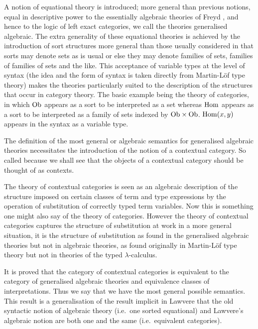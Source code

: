 

A notion of equational theory is introduced; more general than previous notions, equal in descriptive power to the essentially algebraic theories of Freyd \cite{freyd:aspects-of-topoi}, and hence to the logic of left exact categories, we call the theories generalised algebraic.
%
The extra generality of these equational theories is achieved by the introduction of sort structures more general than those usually considered in that sorts may denote sets as is usual or else they may denote families of sets, families of families of sets and the like.
%
This acceptance of variable types at the level of syntax (the idea and the form of syntax is taken directly from Martin-Löf type theory) makes the theories particularly suited to the description of the structures that occur in category theory.
%
The basic example being the theory of categories, in which $\mathrm{Ob}$ appears as a sort to be interpreted as a set whereas $\mathrm{Hom}$ appears as a sort to be interpreted as a family of sets indexed by $\mathrm{Ob} \times \mathrm{Ob}$.
%
$\mathrm{Hom}(x,y)$ appears in the syntax as a variable type.

The definition of the most general or algebraic semantics for generalised algebraic theories necessitates the introduction of the notion of a contextual category.
%
So called because we shall see that the objects of a contextual category should be thought of as contexts.

The theory of contextual categories is seen as an algebraic description of the structure imposed on certain classes of term and type expressions by the operation of substitution of correctly typed term variables.
%
Now this is something one might also say of the theory of categories.
%
%
However the theory of contextual categories captures the structure of substitution at work in a more general situation, it is the structure of substitution as found in the generalised algebraic theories but not in algebraic theories, as found originally in Martin-Löf type theory but not in theories of the typed $\lambda$-calculus.

It is proved that the category of contextual categories is equivalent to the category of generalised algebraic theories and equivalence classes of interpretations.
%
Thus we say that we have the most general possible semantics.
%
This result is a generalisation of the result implicit in Lawvere \cite{lawvere:11} that the old syntactic notion of algebraic theory (i.e.\ one sorted equational) and Lawvere's algebraic notion are both one and the same (i.e.\ equivalent categories).

